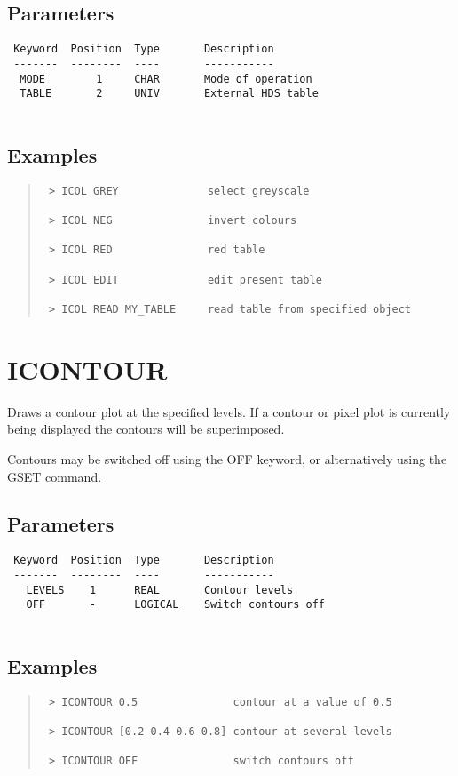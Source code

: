 \documentclass{book}
\renewcommand{\_}{{\tt\char'137}}     %
\begin{document}
\subsection{Parameters}
\begin{verbatim}
 Keyword  Position  Type       Description
 -------  --------  ----       -----------
  MODE        1     CHAR       Mode of operation
  TABLE       2     UNIV       External HDS table
 
\end{verbatim}\subsection{Examples}
\begin{quote}\begin{verbatim}
 > ICOL GREY              select greyscale
 
 > ICOL NEG               invert colours
 
 > ICOL RED               red table
 
 > ICOL EDIT              edit present table
 
 > ICOL READ MY_TABLE     read table from specified object
\end{verbatim}\end{quote}
\section{ICONTOUR}
Draws a contour plot at the specified levels. If a contour or
pixel plot is currently being displayed the contours will be
superimposed.
 
Contours may be switched off using the OFF keyword, or
alternatively using the GSET command.
 
\subsection{Parameters}
\begin{verbatim}
 Keyword  Position  Type       Description
 -------  --------  ----       -----------
   LEVELS    1      REAL       Contour levels
   OFF       -      LOGICAL    Switch contours off
 
\end{verbatim}\subsection{Examples}
\begin{quote}\begin{verbatim}
 > ICONTOUR 0.5               contour at a value of 0.5
 
 > ICONTOUR [0.2 0.4 0.6 0.8] contour at several levels
 
 > ICONTOUR OFF               switch contours off
\end{verbatim}\end{quote}
\end{document}
